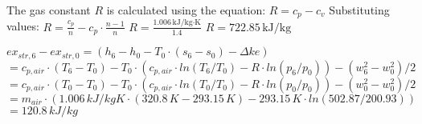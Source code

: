 The gas constant \( R \) is calculated using the equation:  
\( R = c_p - c_v \)  
Substituting values:  
\( R = \frac{c_p}{n} - c_p \cdot \frac{n-1}{n} \)  
\( R = \frac{1.006 \, \text{kJ/kg·K}}{1.4} \)  
\( R = 722.85 \, \text{kJ/kg} \)

\( ex_{str,6} - ex_{str,0} = (h_6 - h_0 - T_0 \cdot (s_6 - s_0) - \Delta ke ) \)  
\( = c_{p,air} \cdot (T_6 - T_0) - T_0 \cdot (c_{p,air} \cdot ln(T_6 / T_0) - R \cdot ln(p_6 / p_0)) - (w_6^2 - w_0^2) / 2 \)  
\( = c_{p,air} \cdot (T_0 - T_0) - T_0 \cdot (c_{p,air} \cdot ln(T_0 / T_0) - R \cdot ln(p_0 / p_0)) - (w_0^2 - w_0^2) / 2 \)  
\( = m_{air} \cdot (1.006 \, kJ/kgK \cdot (320.8 \, K - 293.15 \, K) - 293.15 \, K \cdot ln(502.87 / 200.93)) \)  
\( = 120.8 \, kJ/kg \)